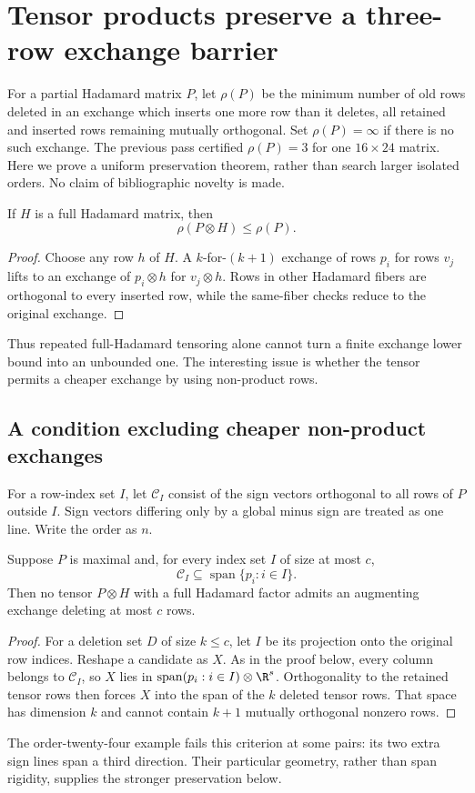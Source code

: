 \section{Tensor products preserve a three-row exchange barrier}
For a partial Hadamard matrix $P$, let $\rho(P)$ be the minimum number
of old rows deleted in an exchange which inserts one more row than it
deletes, all retained and inserted rows remaining mutually orthogonal.
Set $\rho(P)=\infty$ if there is no such exchange. The previous pass
certified $\rho(P)=3$ for one $16\times24$ matrix. Here we prove a
uniform preservation theorem, rather than search larger isolated orders.
No claim of bibliographic novelty is made.

\begin{proposition}
If $H$ is a full Hadamard matrix, then
\[
 \rho(P\otimes H)\le\rho(P).
\]
\end{proposition}
\begin{proof}
Choose any row $h$ of $H$. A $k$-for-$(k+1)$ exchange of rows $p_i$
for rows $v_j$ lifts to an exchange of $p_i\otimes h$ for $v_j\otimes h$.
Rows in other Hadamard fibers are orthogonal to every inserted row,
while the same-fiber checks reduce to the original exchange.
\end{proof}
Thus repeated full-Hadamard tensoring alone cannot turn a finite
exchange lower bound into an unbounded one. The interesting issue is
whether the tensor permits a cheaper exchange by using non-product rows.

\subsection{A condition excluding cheaper non-product exchanges}
For a row-index set $I$, let $\mathcal C_I$ consist of the sign vectors
orthogonal to all rows of $P$ outside $I$. Sign vectors differing only
by a global minus sign are treated as one line. Write the order as $n$.

\begin{proposition}
Suppose $P$ is maximal and, for every index set $I$ of size at most $c$,
\[
 \mathcal C_I\subseteq\operatorname{span}\{p_i:i\in I\}.
\]
Then no tensor $P\otimes H$ with a full Hadamard factor admits an
augmenting exchange deleting at most $c$ rows.
\end{proposition}
\begin{proof}
For a deletion set $D$ of size $k\le c$, let $I$ be its projection
onto the original row indices. Reshape a candidate as $X$. As in the
proof below, every column belongs to $\mathcal C_I$, so $X$ lies in
$\operatorname{span}(p_i:i\in I)\otimes\R^s$. Orthogonality to the
retained tensor rows then forces $X$ into the span of the $k$ deleted
tensor rows. That space has dimension $k$ and cannot contain $k+1$
mutually orthogonal nonzero rows.
\end{proof}
The order-twenty-four example fails this criterion at some pairs: its
two extra sign lines span a third direction. Their particular geometry,
rather than span rigidity, supplies the stronger preservation below.

